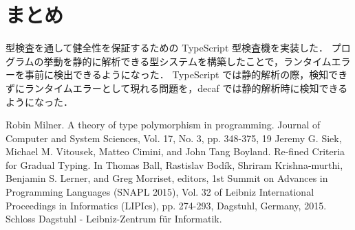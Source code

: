 \documentclass[11pt,twocolumn]{classes/yokou}
\begin{document}
\section{まとめ}

型検査を通して健全性を保証するための TypeScript 型検査機を実装した．
プログラムの挙動を静的に解析できる型システムを構築したことで，ランタイムエラーを事前に検出できるようになった．
TypeScript では静的解析の際，検知できずにランタイムエラーとして現れる問題を，decaf では静的解析時に検知できるようになった．

\begin{thebibliography}{9}
	\bibitem{} Robin Milner. A theory of type polymorphism in programming. Journal of Computer and System Sciences, Vol. 17, No. 3, pp. 348-375, 19
	\bibitem{} Jeremy G. Siek, Michael M. Vitousek, Matteo Cimini, and John Tang Boyland. Re-fined Criteria for Gradual Typing. In Thomas Ball, Rastislav Bodík, Shriram Krishna-murthi, Benjamin S. Lerner, and Greg Morriset, editors, 1st Summit on Advances in Programming Languages (SNAPL 2015), Vol. 32 of Leibniz International Proceedings in Informatics (LIPIcs), pp. 274-293, Dagstuhl, Germany, 2015. Schloss Dagstuhl - Leibniz-Zentrum für Informatik.
\end{thebibliography}
\end{document}
